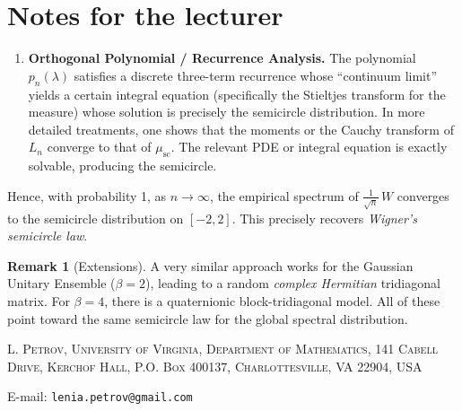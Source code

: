 \documentclass[letterpaper,11pt,oneside,reqno]{article}
\numberwithin{equation}{section}
\theoremstyle{definition}
\newtheorem{remark}[proposition]{Remark}
\newenvironment{lnotes}{\section*{Notes for the lecturer}}{}
\begin{document}
\begin{lnotes}
\begin{enumerate}[1.]
\item \textbf{Orthogonal Polynomial / Recurrence Analysis.}
   The polynomial \(p_n(\lambda)\) satisfies a discrete three-term recurrence whose ``continuum limit'' yields a certain integral equation (specifically the Stieltjes transform for the measure) whose solution is precisely the semicircle distribution.  In more detailed treatments, one shows that the moments or the Cauchy transform of \(L_n\) converge to that of \(\mu_{\mathrm{sc}}\).  The relevant PDE or integral equation is exactly solvable, producing the semicircle.

\end{enumerate}

Hence, with probability 1, as \(n\to\infty\), the empirical spectrum of \(\tfrac{1}{\sqrt{n}}\,W\) converges to the semicircle distribution on \([-2,2]\).  This precisely recovers \emph{Wigner’s semicircle law}.

\begin{remark}[Extensions]
A very similar approach works for the Gaussian Unitary Ensemble (\(\beta=2\)), leading to a random \emph{complex Hermitian} tridiagonal matrix.  For \(\beta=4\), there is a quaternionic block-tridiagonal model.  All of these point toward the same semicircle law for the global spectral distribution.
\end{remark}


\end{lnotes}







\medskip

\textsc{L. Petrov, University of Virginia, Department of Mathematics, 141 Cabell Drive, Kerchof Hall, P.O. Box 400137, Charlottesville, VA 22904, USA}

E-mail: \texttt{lenia.petrov@gmail.com}
\end{document}
